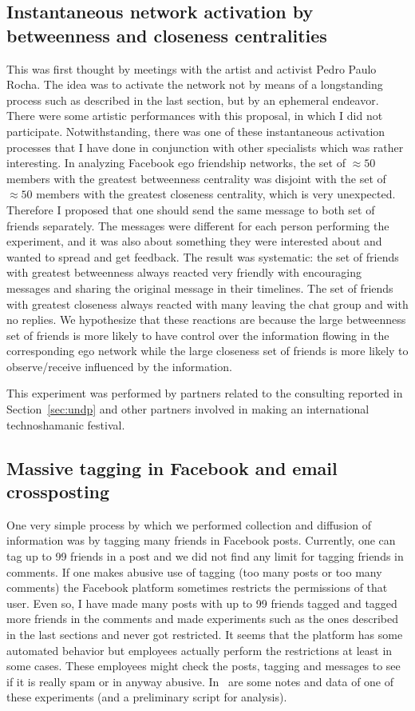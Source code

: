 \begin{apendicesenv}
\subsection{Instantaneous network activation by betweenness and closeness centralities}
This was first thought by meetings with the artist and activist Pedro Paulo Rocha.
The idea was to activate the network not by means of a longstanding process such
as described in the last section, but by an ephemeral endeavor.
There were some artistic performances with this proposal, in which I did
not participate.
Notwithstanding, there was one of these instantaneous activation processes that
I have done in conjunction with other specialists which was rather interesting.
In analyzing Facebook ego friendship networks, the set of $\approx 50$ members with
the greatest betweenness centrality was disjoint with the set of $\approx 50$ members
with the greatest closeness centrality, which is very unexpected.
Therefore I proposed that one should send the same message to both set of friends separately.
The messages were different for each person performing the experiment,
and it was also about something they were interested about and wanted to spread and get feedback.
The result was systematic: the set of friends with greatest betweenness always reacted very friendly
with encouraging messages and sharing the original message in their timelines.
The set of friends with greatest closeness always reacted with many leaving the chat group
and with no replies.
We hypothesize that these reactions are because the large betweenness set of friends is more
likely to have control over the information flowing in the corresponding ego network while
the large closeness set of friends is more likely to observe/receive influenced by the information.

This experiment was performed by partners related to the consulting reported in Section~\ref{sec:undp}
and other partners involved in making an international technoshamanic festival.

\subsection{Massive tagging in Facebook and email crossposting}
One very simple process by which we performed collection and diffusion of information
was by tagging many friends in Facebook posts.
Currently, one can tag up to 99 friends in a post
and we did not find any limit for tagging friends in comments.
If one makes abusive use of tagging (too many posts or too many comments)
the Facebook platform sometimes restricts the permissions of that user.
Even so, I have made many posts with up to 99 friends tagged and tagged more
friends in the comments and made experiments such as the ones described in the
last sections and never got restricted.
It seems that the platform has some automated behavior but employees actually
perform the restrictions at least in some cases.
These employees might check the posts, tagging and messages to see if it is
really spam or in anyway abusive.
In~\cite{anExp} are some notes and data of one of these experiments (and a preliminary script for analysis).


\end{apendicesenv}
